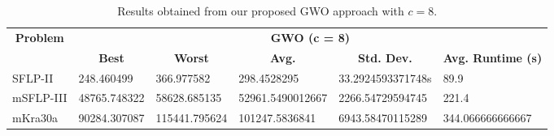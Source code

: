 \begin{table}[h!]
\begin{adjustwidth}{-1.18in}{}
	\centering
	\begin{tabular}{|l|l|l|l|l|l|}
	\hline
	\multicolumn{1}{|c|}{\multirow{2}{*}{\textbf{Problem}}} & \multicolumn{5}{c|}{\textbf{GWO (c = 8)}} \\ \cline{2-6} 
	\multicolumn{1}{|c|}{}                                  & \multicolumn{1}{c|}{\textbf{Best}} & \multicolumn{1}{c|}{\textbf{Worst}} & \multicolumn{1}{c|}{\textbf{Avg.}} & \multicolumn{1}{c|}{\textbf{Std. Dev.}} & \multicolumn{1}{c|}{\textbf{Avg. Runtime (s)}} \\ \hline
	SFLP-II                                                 & 248.460499                                  & 366.977582                                   & 298.4528295                     & 33.2924593371748s                                 & 89.9                                  \\ \hline
	mSFLP-III                                               & 48765.748322                                & 58628.685135                                 & 52961.5490012667						         & 2266.54729594745                              & 221.4                               \\ \hline
	mKra30a                                               & 90284.307087                                & 115441.795624                                 &
	101247.5836841							&
	6943.58470115289							&
	344.066666666667						\\ \hline
	\end{tabular}
\end{adjustwidth}
\caption{Results obtained from our proposed GWO approach with $c = 8$.}
\label{approach-gwo-c8-results}
\end{table}

